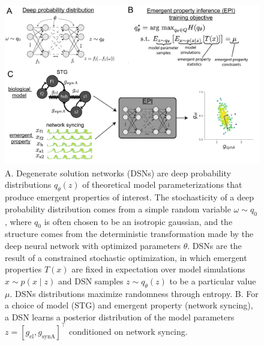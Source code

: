 \documentclass[11pt]{article}
\begin{document}
\begin{figure}
\begin{center}
\includegraphics[scale=0.4]{figs/fig2/fig2.pdf}
\end{center}
\caption{A. Degenerate solution networks (DSNs) are deep probability distributions $q_\theta(z)$ of theoretical model parameterizations that produce emergent properties of interest.  The stochasticity of a deep probability distribution comes from a simple random variable $\omega \sim q_0$, where $q_0$ is often chosen to be an isotropic gaussian, and the structure comes from the deterministic transformation made by the deep neural network with optimized parameters $\theta$.  DSNs are the result of a constrained stochastic optimization, in which emergent properties $T(x)$ are fixed in expectation over model simulations $x \sim p(x \mid z)$ and DSN samples $z \sim q_\theta(z)$ to be a particular value $\mu$.  DSNs distributions maximize randomness through entropy. B. For a choice of model (STG) and emergent property (network syncing), a DSN learns a posterior distribution of the model parameters  $z = \left[g_{\text{el}}, g_{\text{synA}} \right]^\top$ conditioned on network syncing.}
\end{figure}
\end{document}
